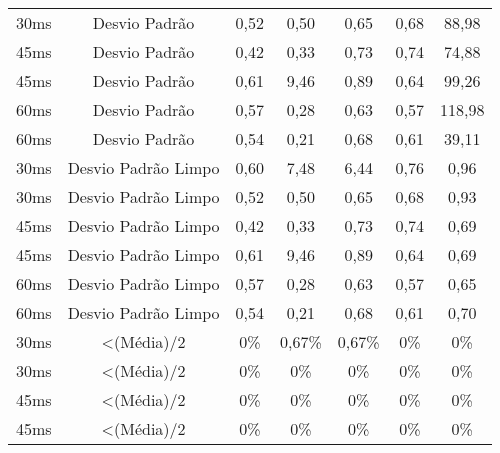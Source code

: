 \begin{table}[]
\begin{tabular}{|c|c|ccccc|}
30ms              & Desvio Padrão       & 0,52              & 0,50              & 0,65              & 0,68              & 88,98             \\
45ms              & Desvio Padrão       & 0,42              & 0,33              & 0,73              & 0,74              & 74,88             \\
45ms              & Desvio Padrão       & 0,61              & 9,46              & 0,89              & 0,64              & 99,26             \\
60ms              & Desvio Padrão       & 0,57              & 0,28              & 0,63              & 0,57              & 118,98            \\
60ms              & Desvio Padrão       & 0,54              & 0,21              & 0,68              & 0,61              & 39,11             \\ \hline
30ms              & Desvio Padrão Limpo & 0,60              & 7,48              & 6,44              & 0,76              & 0,96              \\
30ms              & Desvio Padrão Limpo & 0,52              & 0,50              & 0,65              & 0,68              & 0,93              \\
45ms              & Desvio Padrão Limpo & 0,42              & 0,33              & 0,73              & 0,74              & 0,69              \\
45ms              & Desvio Padrão Limpo & 0,61              & 9,46              & 0,89              & 0,64              & 0,69              \\
60ms              & Desvio Padrão Limpo & 0,57              & 0,28              & 0,63              & 0,57              & 0,65              \\
60ms              & Desvio Padrão Limpo & 0,54              & 0,21              & 0,68              & 0,61              & 0,70              \\ \hline
30ms              & \textless (Média)/2 & 0\%            & 0,67\%            & 0,67\%            & 0\%            & 0\%            \\
30ms              & \textless (Média)/2 & 0\%            & 0\%            & 0\%            & 0\%            & 0\%            \\
45ms              & \textless (Média)/2 & 0\%            & 0\%            & 0\%            & 0\%            & 0\%            \\
45ms              & \textless (Média)/2 & 0\%            & 0\%            & 0\%            & 0\%            & 0\%            \\

\end{tabular}
\end{table}
